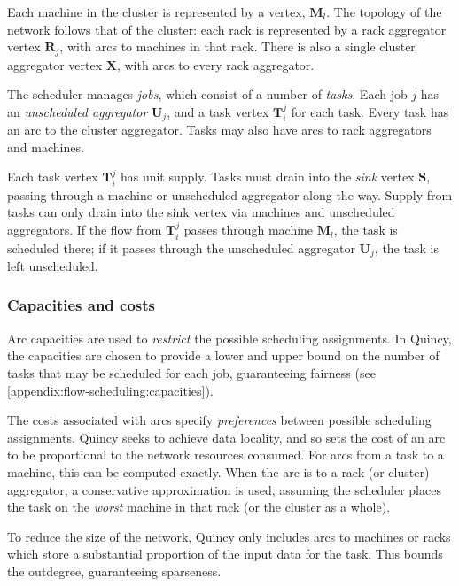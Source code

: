 Each machine in the cluster is represented by a vertex, $\mathbf{M}_l$. The topology of the network follows that of the cluster: each rack is represented by a rack aggregator vertex $\mathbf{R}_j$, with arcs to  machines in that rack. There is also a single cluster aggregator vertex $\mathbf{X}$, with arcs to every rack aggregator.

The scheduler manages \emph{jobs}, which consist of a number of \emph{tasks}. Each job $j$ has an \emph{unscheduled aggregator} $\mathbf{U}_j$, and a task vertex $\mathbf{T}_i^j$ for each task. Every task has an arc to the cluster aggregator. Tasks may also have arcs to rack aggregators and machines.

Each task vertex $\mathbf{T}_i^j$ has unit supply. Tasks must drain into the \emph{sink} vertex $\mathbf{S}$, passing through a machine or unscheduled aggregator along the way\footnotemark.  Supply from tasks can only drain into the sink vertex via machines and unscheduled aggregators. If the flow from $\mathbf{T}_i^j$ passes through machine $\mathbf{M}_l$, the task is scheduled there; if it passes through the unscheduled aggregator $\mathbf{U}_j$, the task is left unscheduled.

\subsubsection{Capacities and costs}
Arc capacities are used to \emph{restrict} the possible scheduling assignments. In Quincy, the capacities are chosen to provide a lower and upper bound on the number of tasks that may be scheduled for each job, guaranteeing fairness (see \cref{appendix:flow-scheduling:capacities}).

The costs associated with arcs specify \emph{preferences} between possible scheduling assignments. Quincy seeks to achieve data locality, and so sets the cost of an arc to be proportional to the network resources consumed. For arcs from a task to a machine, this can be computed exactly. When the arc is to a rack (or cluster) aggregator, a conservative approximation is used, assuming the scheduler places the task on the \emph{worst} machine in that rack (or the cluster as a whole).

To reduce the size of the network, Quincy only includes arcs to machines or racks which store a substantial proportion of the input data for the task. This bounds the outdegree, guaranteeing sparseness. 

